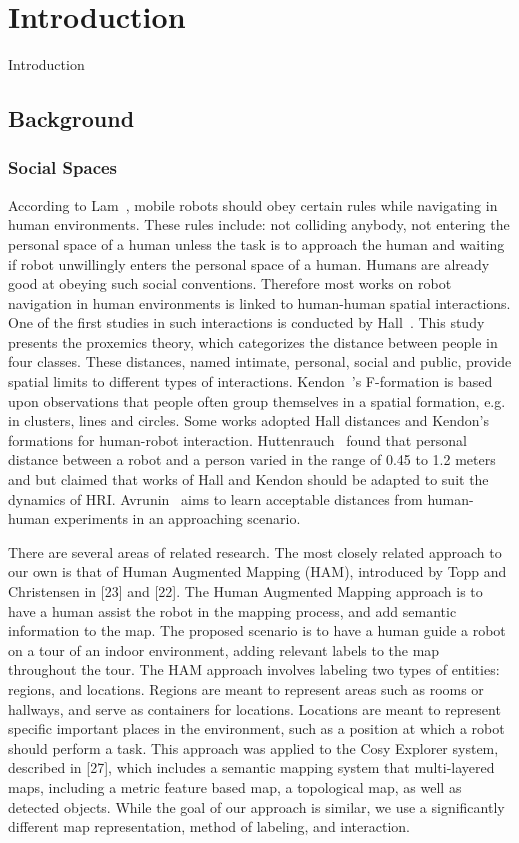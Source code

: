 \chapter{Introduction}
\label{chapter:introduction}
Introduction

\section{Background}

\subsection{Social Spaces}

According to Lam~\cite{lam2011human}, mobile robots should obey certain rules while navigating in human environments. These rules include: not colliding anybody, not entering the personal space of a human unless the task is to approach the human and waiting if robot unwillingly enters the personal space of a human. Humans are already good at obeying such social conventions. Therefore most works on robot navigation in human environments is linked to human-human spatial interactions. One of the first studies in such interactions is conducted by Hall~\cite{hall1969hidden}. This study presents the proxemics theory, which categorizes the distance between people in four classes. These distances, named intimate, personal, social and public, provide spatial limits to different types of interactions. Kendon~\cite{kendon1990conducting}'s F-formation is based upon observations that people often group themselves in a spatial formation, e.g. in clusters, lines and circles. Some works adopted Hall distances and Kendon's formations for human-robot interaction. Huttenrauch~\cite{huttenrauch2006investigating} found that personal distance between a robot and a person varied in the range of 0.45 to 1.2 meters and but claimed that works of Hall and Kendon should be adapted to suit the dynamics of HRI. Avrunin~\cite{avrunin2013using} aims to learn acceptable distances from human-human experiments in an approaching scenario. 


There are several areas of related research. The most
closely related approach to our own is that of Human
Augmented Mapping (HAM), introduced by Topp and Christensen
in [23] and [22]. The Human Augmented Mapping
approach is to have a human assist the robot in the mapping
process, and add semantic information to the map. The
proposed scenario is to have a human guide a robot on a tour
of an indoor environment, adding relevant labels to the map
throughout the tour. The HAM approach involves labeling
two types of entities: regions, and locations. Regions are
meant to represent areas such as rooms or hallways, and
serve as containers for locations. Locations are meant to
represent specific important places in the environment, such
as a position at which a robot should perform a task. This
approach was applied to the Cosy Explorer system, described
in [27], which includes a semantic mapping system that
multi-layered maps, including a metric feature based map, a
topological map, as well as detected objects. While the goal
of our approach is similar, we use a significantly different
map representation, method of labeling, and interaction.